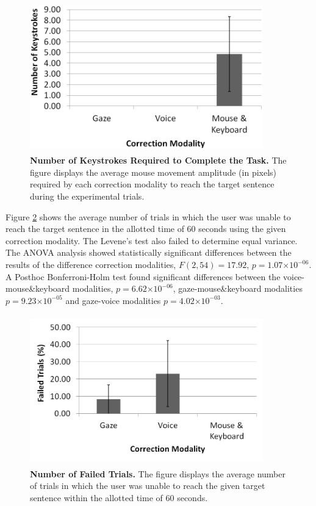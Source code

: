 \documentclass[]{article}
\providecommand{\e}[1]{\ensuremath{\times 10^{#1}}}
\begin{document}
\begin{figure}[!ht]
\begin{center}
\vspace{-3mm}
\includegraphics[width=0.9\textwidth,height=65mm]{figures/keystrokes.png}
\end{center}
\caption{\textbf{Number of Keystrokes Required to Complete the Task.} The figure displays the average mouse movement amplitude (in pixels)
required by each correction modality to reach the target sentence during the experimental trials.}
\label{keystrokes}
\end{figure}


Figure \ref{failFig} shows the average number of trials in which the user was unable to reach the target sentence in the
allotted time of 60 seconds using the given correction modality. The Levene's test also failed to determine equal
variance. The ANOVA analysis showed statistically significant differences between the results of the
difference correction modalities, $F(2,54)=17.92$, $p=1.07\e{-06}$.   A Posthoc Bonferroni-Holm test found
significant differences between the voice-mouse\&keyboard modalities, $p=6.62\e{-06}$, gaze-mouse\&keyboard modalities
$p=9.23\e{-05}$ and gaze-voice modalities $p=4.02\e{-03}$.


\begin{figure}[!ht]
\begin{center}
\vspace{-3mm}
\includegraphics[width=0.9\textwidth,height=65mm]{figures/fail.png}
\end{center}
\caption{\textbf{Number of Failed Trials.} The figure displays the average number of trials in which the user
was unable to reach the given target sentence within the allotted time of 60 seconds.}
\label{failFig}
\end{figure}
\end{document}
